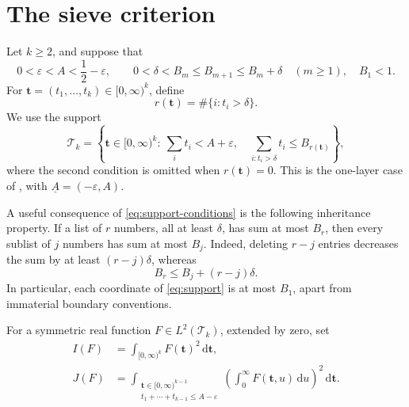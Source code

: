 \documentclass[11pt,reqno]{amsart}
\theoremstyle{definition}
\theoremstyle{remark}
\numberwithin{equation}{section}
\newcommand{\dd}{\,\mathrm d}
\newcommand{\Tset}{\mathcal T}
\begin{document}
\section{The sieve criterion}\label{sec:sieve}
Let $k\ge2$, and suppose that
\begin{equation}\label{eq:support-conditions}
 0<\varepsilon<A<\frac12-\varepsilon,\qquad
 0<\delta<B_m\le B_{m+1}\le B_m+\delta\quad(m\ge1),\quad B_1<1.
\end{equation}
For $\mathbf t=(t_1,\ldots,t_k)\in[0,\infty)^k$, define
\[
 r(\mathbf t)=\#\{i:t_i>\delta\}.
\]
We use the support
\begin{equation}\label{eq:support}
 \Tset_k=\left\{\mathbf t\in[0,\infty)^k:\ \sum_i t_i<A+\varepsilon,\quad
 \sum_{i:t_i>\delta}t_i\le B_{r(\mathbf t)}\right\},
\end{equation}
where the second condition is omitted when $r(\mathbf t)=0$.
This is the one-layer case of \cite[Definition~1]{Stadlmann26}, with
$\underline A=(-\varepsilon,A)$.

A useful consequence of \eqref{eq:support-conditions} is the following
inheritance property. If a list of $r$ numbers, all at least $\delta$,
has sum at most $B_r$, then every sublist of $j$ numbers has sum at most
$B_j$. Indeed, deleting $r-j$ entries decreases the sum by at least
$(r-j)\delta$, whereas
\begin{equation}\label{eq:inheritance}
 B_r\le B_j+(r-j)\delta.
\end{equation}
In particular, each coordinate of \eqref{eq:support} is at most $B_1$,
apart from immaterial boundary conventions.

For a symmetric real function $F\in L^2(\Tset_k)$, extended by zero, set
\begin{align}
 I(F)&=\int_{[0,\infty)^k} F(\mathbf t)^2\dd\mathbf t,
       \label{eq:I}\\
 J(F)&=\int_{\substack{\mathbf t\in[0,\infty)^{k-1}\\
                  t_1+\cdots+t_{k-1}\le A-\varepsilon}}
       \left(\int_0^\infty F(\mathbf t,u)\dd u\right)^2
       \dd\mathbf t.\label{eq:J}
\end{align}
\end{document}
